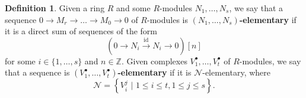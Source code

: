 \documentclass[11pt,fleqn]{article}
\theoremstyle{plain}
\theoremstyle{definition}
\newtheorem{definition}[theorem]{Definition}
\theoremstyle{remark}
\numberwithin{equation}{theorem}
\newcommand{\id}{\mathrm{id}}
\newcommand{\define}[1]{\textbf{#1}}
\renewcommand{\leq}{\leqslant}
\begin{document}
        \begin{definition}\label{definition:elementary-sequence}
            Given a ring $R$ and some $R$-modules $N_1,\ldots,N_s$, we say that a sequence $0\to M_r\to\ldots\to M_0\to0$ of $R$-modules is \define{$(N_1,\ldots,N_s)$-elementary} if it is a direct sum of sequences of the form
            \[
                (0\to N_i\xrightarrow{\id}N_i\to 0)[n]
            \]
            for some $i\in\{1,\ldots,s\}$ and $n\in\mathbb{Z}$.
            Given complexes $V_1^\bullet,\ldots,V_t^\bullet$ of $R$-modules, we say that a sequence is \define{$(V_1^\bullet,\ldots,V_t^\bullet)$-elementary} if it is $\mathcal{N}$-elementary, where
            \[
                \mathcal{N} = \left\{V_i^j \,\,\big|\,\, 1\leq i\leq t,1\leq j\leq s\right\}.
            \]
        \end{definition}
\end{document}
